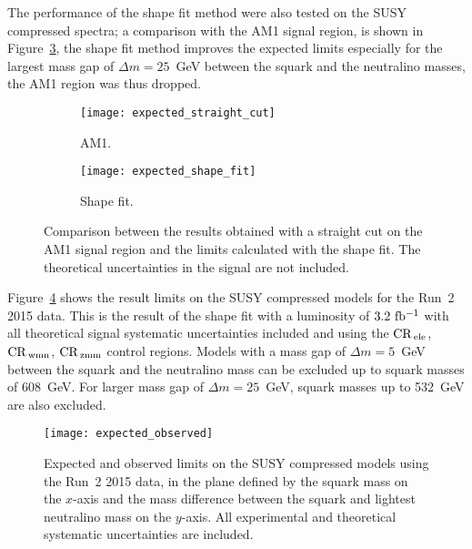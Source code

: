 The performance of the shape fit method were also tested on the SUSY compressed
spectra; a comparison with the AM1 signal region, is shown in
Figure~\ref{fig:shape_straight_comparison}, the shape fit method improves the
expected limits especially for the largest mass gap of $\Delta m = 25$~GeV
between the squark and the neutralino masses, the AM1 region was thus dropped.
\begin{figure}[!h]
  \centering
  \begin{subfigure}[t]{.48\linewidth}
    \texttt{[image: expected\_straight\_cut]}
    \caption{AM1.}
    \label{fig:expected_im1}
  \end{subfigure}
  \begin{subfigure}[t]{.48\linewidth}
    \texttt{[image: expected\_shape\_fit]}
    \caption{Shape fit.}
    \label{fig:expected_straight}
  \end{subfigure}
  \caption{Comparison between the results obtained with a straight cut on the
    AM1 signal region and the limits calculated with the shape fit. The
    theoretical uncertainties in the signal are not included.}
  \label{fig:shape_straight_comparison}
\end{figure}

Figure~\ref{fig:expected_observed} shows the result limits on the SUSY
compressed models for the Run~2 2015 data. This is the result of the shape fit
with a luminosity of $3.2~\mbox{fb$^{-1}$}$ with all theoretical signal systematic
uncertainties included and using the $\mathrm{CR}_\mathrm{\, ele}$, $\mathrm{CR}_\mathrm{\, wmn}$, $\mathrm{CR}_\mathrm{\, zmm}$ control
regions. Models with a mass gap of $\Delta m = 5$~GeV between the squark and the
neutralino mass can be excluded up to squark masses of 608~GeV. For larger mass
gap of $\Delta m = 25$~GeV, squark masses up to 532~GeV are also excluded.
\begin{figure}[!h]
  \centering
    \texttt{[image: expected\_observed]}
    \caption{Expected and observed limits on the SUSY compressed models using
      the Run~2 2015 data, in the plane defined by the squark mass on the
      $x$-axis and the mass difference between the squark and lightest
      neutralino mass on the $y$-axis. All experimental and theoretical
      systematic uncertainties are included.}
\label{fig:results:susy:compressed_observed}
    \label{fig:expected_observed}
\end{figure}
